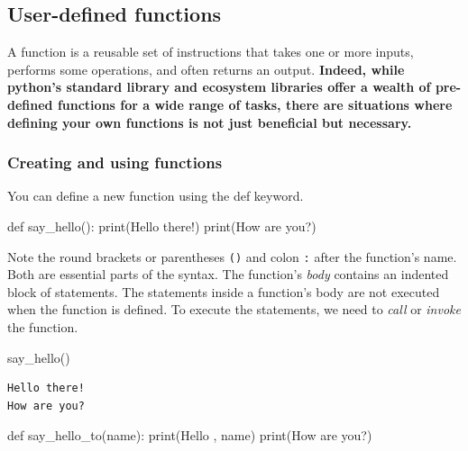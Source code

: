 \documentclass[
  letterpaper,
  DIV=11,
  numbers=noendperiod]{scrreprt}
\newenvironment{Shaded}{\begin{snugshade}}{\end{snugshade}}
\newcommand{\BuiltInTok}[1]{\textcolor[rgb]{0.00,0.23,0.31}{#1}}
\newcommand{\KeywordTok}[1]{\textcolor[rgb]{0.00,0.23,0.31}{#1}}
\newcommand{\NormalTok}[1]{\textcolor[rgb]{0.00,0.23,0.31}{#1}}
\newcommand{\StringTok}[1]{\textcolor[rgb]{0.13,0.47,0.30}{#1}}
\begin{document}
\hypertarget{user-defined-functions}{%
\subsection{User-defined functions}\label{user-defined-functions}}

A function is a reusable set of instructions that takes one or more
inputs, performs some operations, and often returns an output.
\textbf{Indeed, while python's standard library and ecosystem libraries
offer a wealth of pre-defined functions for a wide range of tasks, there
are situations where defining your own functions is not just beneficial
but necessary.}

\hypertarget{creating-and-using-functions}{%
\subsubsection{Creating and using
functions}\label{creating-and-using-functions}}

You can define a new function using the def keyword.

\begin{Shaded}
\begin{Highlighting}[]
\KeywordTok{def}\NormalTok{ say\_hello():}
    \BuiltInTok{print}\NormalTok{(}\StringTok{\textquotesingle{}Hello there!\textquotesingle{}}\NormalTok{)}
    \BuiltInTok{print}\NormalTok{(}\StringTok{\textquotesingle{}How are you?\textquotesingle{}}\NormalTok{)}
\end{Highlighting}
\end{Shaded}

Note the round brackets or parentheses \texttt{()} and colon \texttt{:}
after the function's name. Both are essential parts of the syntax. The
function's \emph{body} contains an indented block of statements. The
statements inside a function's body are not executed when the function
is defined. To execute the statements, we need to \emph{call} or
\emph{invoke} the function.

\begin{Shaded}
\begin{Highlighting}[]
\NormalTok{say\_hello()}
\end{Highlighting}
\end{Shaded}

\begin{verbatim}
Hello there!
How are you?
\end{verbatim}

\begin{Shaded}
\begin{Highlighting}[]
\KeywordTok{def}\NormalTok{ say\_hello\_to(name):}
    \BuiltInTok{print}\NormalTok{(}\StringTok{\textquotesingle{}Hello \textquotesingle{}}\NormalTok{, name)}
    \BuiltInTok{print}\NormalTok{(}\StringTok{\textquotesingle{}How are you?\textquotesingle{}}\NormalTok{)}
\end{Highlighting}
\end{Shaded}
\end{document}
